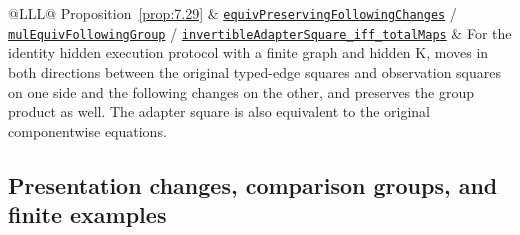 \begin{xltabular}{\linewidth}{@{}LLL@{}}
Proposition~\ref{prop:7.29} & \href{https://github.com/iroha1203/AlgebraicArchitectureTheoryV2/blob/719f81f47d410701fd82c2bc88613cc140c59377/research/lean/ResearchLean/AG/RealizationReconstruction/FixedFProtocolConnection.lean\#L350}{\texttt{equiv\allowbreak{}Preserving\allowbreak{}Following\allowbreak{}Changes}} / \href{https://github.com/iroha1203/AlgebraicArchitectureTheoryV2/blob/719f81f47d410701fd82c2bc88613cc140c59377/research/lean/ResearchLean/AG/RealizationReconstruction/FixedFProtocolGroupConnection.lean\#L245}{\texttt{mul\allowbreak{}Equiv\allowbreak{}Following\allowbreak{}Group}} / \href{https://github.com/iroha1203/AlgebraicArchitectureTheoryV2/blob/719f81f47d410701fd82c2bc88613cc140c59377/research/lean/ResearchLean/AG/RealizationReconstruction/FixedFProtocolConnection.lean\#L524}{\texttt{invertible\allowbreak{}Adapter\allowbreak{}Square\_\allowbreak{}iff\_\allowbreak{}total\allowbreak{}Maps}} & For the identity hidden execution protocol with a finite graph and hidden K, moves in both directions between the original typed-edge squares and observation squares on one side and the following changes on the other, and preserves the group product as well. The adapter square is also equivalent to the original componentwise equations. \\
\bottomrule
\end{xltabular}

\subsection*{Presentation changes, comparison groups, and finite examples}

